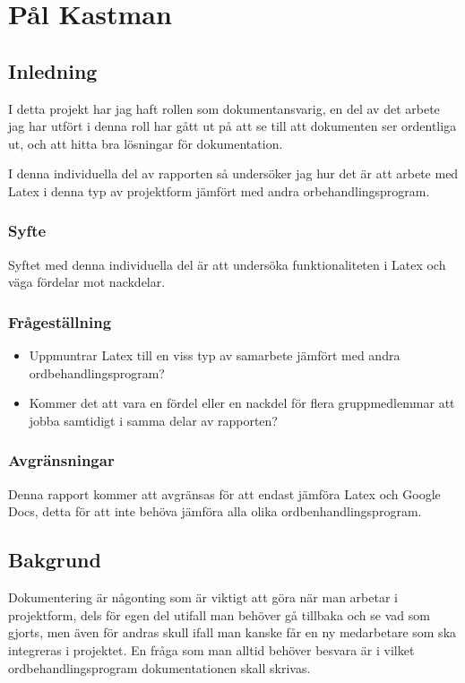 \section{Pål Kastman}
\subsection{Inledning}
I detta projekt har jag haft rollen som dokumentansvarig, en del av det arbete jag har utfört i denna roll har gått ut på att se till att dokumenten ser ordentliga ut, och att hitta bra lösningar för dokumentation.

I denna individuella del av rapporten så undersöker jag hur det är att arbete med Latex i denna typ av projektform jämfört med andra orbehandlingsprogram.

\subsubsection{Syfte}
Syftet med denna individuella del är att undersöka funktionaliteten i Latex och väga fördelar mot nackdelar.

\subsubsection{Frågeställning}
\begin{itemize}
\item Uppmuntrar Latex till en viss typ av samarbete jämfört med andra ordbehandlingsprogram?
\item Kommer det att vara en fördel eller en nackdel för flera gruppmedlemmar att jobba samtidigt i samma delar av rapporten?
\end{itemize}

\subsubsection{Avgränsningar} %
Denna rapport kommer att avgränsas för att endast jämföra Latex och Google Docs, detta för att inte behöva jämföra alla olika ordbenhandlingsprogram.

\subsection{Bakgrund}
Dokumentering är någonting som är viktigt att göra när man arbetar i projektform, dels för egen del utifall man behöver gå tillbaka och se vad som gjorts, men även för andras skull ifall man kanske får en ny medarbetare som ska integreras i 
projektet. En fråga som man alltid behöver besvara är i vilket ordbehandlingsprogram dokumentationen skall skrivas. 

